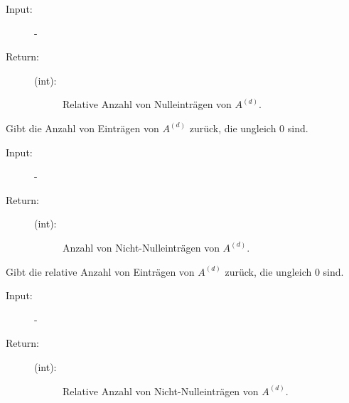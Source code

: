 \documentclass[a4paper,10pt,ngerman, oneside,openright]{sphinxmanual}
\begin{document}
\begin{fulllineitems}
\begin{fulllineitems}
\begin{description}
\item[{Input:}] -\leavevmode
\item[{Return:}] \leavevmode\begin{description}
\item[{(int):}] \leavevmode
Relative Anzahl von Nulleinträgen von $A^{(d)}$.

\end{description}

\end{description}

\end{fulllineitems}


\clearpage
\begin{fulllineitems}
\label{\detokenize{index:sparse.Sparse.anz_nn_abs}}
Gibt die Anzahl von Einträgen von $A^{(d)}$ zurück, die ungleich 0 sind.

\begin{description}
\item[{Input:}] -\leavevmode
\item[{Return:}] \leavevmode\begin{description}
\item[{(int):}] \leavevmode
Anzahl von Nicht-Nulleinträgen von $A^{(d)}$.

\end{description}

\end{description}

\end{fulllineitems}


\begin{fulllineitems}
\label{\detokenize{index:sparse.Sparse.anz_nn_rel}}
Gibt die relative Anzahl von Einträgen von $A^{(d)}$ zurück, die ungleich 0 sind.

\begin{description}
\item[{Input:}] -\leavevmode
\item[{Return:}] \leavevmode\begin{description}
\item[{(int):}] \leavevmode
Relative Anzahl von Nicht-Nulleinträgen von $A^{(d)}$.


\end{description}
\end{description}
\end{fulllineitems}
\end{fulllineitems}
\end{document}
